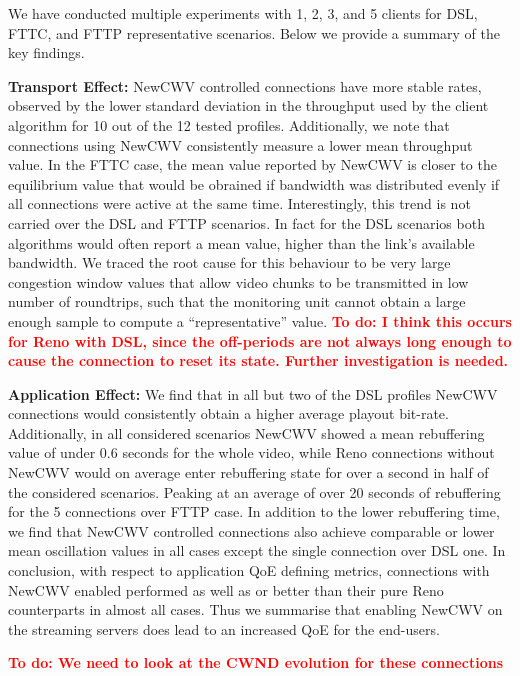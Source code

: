 \documentclass[10pt,sigconf]{acmart}
\newcommand{\todo}[1]{\textbf{\textcolor{red}{To do: #1}}}
\begin{document}
We have conducted multiple experiments with  1, 2, 3, and 5 clients for DSL, FTTC, and FTTP representative scenarios. Below we provide a summary of the key findings. 

\textbf{Transport Effect:} NewCWV controlled connections have more stable rates, observed by the lower standard deviation in the throughput used by the client algorithm for 10 out of the 12 tested profiles. Additionally, we note that connections using NewCWV consistently measure a lower mean throughput value. In the FTTC case, the mean value reported by NewCWV is closer to the equilibrium value that would be obrained if bandwidth was distributed evenly if all connections were active at the same time. Interestingly, this trend is not carried over the DSL and FTTP scenarios. In fact for the DSL scenarios both algorithms would often report a mean value, higher than the link's available bandwidth. We traced the root cause for this behaviour to be very large congestion window values that allow video chunks to be transmitted in low number of roundtrips, such that the monitoring unit cannot obtain a large enough sample to compute a ``representative'' value.
\todo{I think this occurs for Reno with DSL, since the off-periods are not always long enough to cause the connection to reset its state. Further investigation is needed.}


\textbf{Application Effect:} We find that in all but two of the DSL profiles NewCWV connections would consistently obtain a higher average playout bit-rate. Additionally, in all considered scenarios NewCWV showed a mean rebuffering value of under 0.6 seconds for the whole video, while Reno connections without NewCWV would on average enter rebuffering state for over a second in half of the considered scenarios. Peaking at an average of over 20 seconds of rebuffering for the 5 connections over FTTP case. In addition to the lower rebuffering time, we find that NewCWV controlled connections also achieve comparable or lower mean oscillation values in all cases except the single connection over DSL one. In conclusion, with respect to application QoE defining metrics, connections with NewCWV enabled performed as well as or better than their pure Reno counterparts in almost all cases. Thus we summarise that enabling NewCWV on the streaming servers does lead to an increased QoE for the end-users. 

\todo{We need to look at the CWND evolution for these connections}

\end{document}
